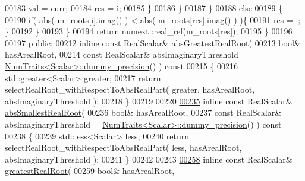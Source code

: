 \begin{DoxyCode}
00183               val = curr;
00184               res = i;
00185             \}
00186           \}
00187         \}
00188         \textcolor{keywordflow}{else}
00189         \{
00190           \textcolor{keywordflow}{if}( abs( m\_roots[i].imag() ) < abs( m\_roots[res].imag() ) )\{
00191             res = i; \}
00192         \}
00193       \}
00194       \textcolor{keywordflow}{return} numext::real\_ref(m\_roots[res]);
00195     \}
00196 
00197   \textcolor{keyword}{public}:
\hyperlink{class_eigen_1_1_polynomial_solver_base_aa2f003d9662af8c776f1a1c12a9d4210}{00212}     \textcolor{keyword}{inline} \textcolor{keyword}{const} RealScalar& \hyperlink{class_eigen_1_1_polynomial_solver_base_aa2f003d9662af8c776f1a1c12a9d4210}{absGreatestRealRoot}(
00213         \textcolor{keywordtype}{bool}& hasArealRoot,
00214         \textcolor{keyword}{const} RealScalar& absImaginaryThreshold = 
      \hyperlink{group___core___module_struct_eigen_1_1_num_traits}{NumTraits<Scalar>::dummy\_precision}() )\textcolor{keyword}{ const}
00215 \textcolor{keyword}{    }\{
00216       std::greater<Scalar> greater;
00217       \textcolor{keywordflow}{return} selectRealRoot\_withRespectToAbsRealPart( greater, hasArealRoot, absImaginaryThreshold );
00218     \}
00219 
00220 
\hyperlink{class_eigen_1_1_polynomial_solver_base_a9316eeb24076bcd4f60ea4d7f3e549eb}{00235}     \textcolor{keyword}{inline} \textcolor{keyword}{const} RealScalar& \hyperlink{class_eigen_1_1_polynomial_solver_base_a9316eeb24076bcd4f60ea4d7f3e549eb}{absSmallestRealRoot}(
00236         \textcolor{keywordtype}{bool}& hasArealRoot,
00237         \textcolor{keyword}{const} RealScalar& absImaginaryThreshold = 
      \hyperlink{group___core___module_struct_eigen_1_1_num_traits}{NumTraits<Scalar>::dummy\_precision}() )\textcolor{keyword}{ const}
00238 \textcolor{keyword}{    }\{
00239       std::less<Scalar> less;
00240       \textcolor{keywordflow}{return} selectRealRoot\_withRespectToAbsRealPart( less, hasArealRoot, absImaginaryThreshold );
00241     \}
00242 
00243 
\hyperlink{class_eigen_1_1_polynomial_solver_base_a5094b7ccc49918b7c7ae9e2a8c49d4bd}{00258}     \textcolor{keyword}{inline} \textcolor{keyword}{const} RealScalar& \hyperlink{class_eigen_1_1_polynomial_solver_base_a5094b7ccc49918b7c7ae9e2a8c49d4bd}{greatestRealRoot}(
00259         \textcolor{keywordtype}{bool}& hasArealRoot,

\end{DoxyCode}
